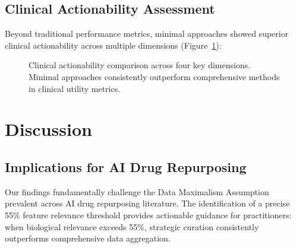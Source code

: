 \documentclass{article}
\begin{document}
\subsection{Clinical Actionability Assessment}

Beyond traditional performance metrics, minimal approaches showed superior clinical actionability across multiple dimensions (Figure~\ref{fig:actionability}):

\begin{figure}[t]
\centering
{}
\caption{Clinical actionability comparison across four key dimensions. Minimal approaches consistently outperform comprehensive methods in clinical utility metrics.}
\label{fig:actionability}
\end{figure}

\section{Discussion}

\subsection{Implications for AI Drug Repurposing}

Our findings fundamentally challenge the Data Maximalism Assumption prevalent across AI drug repurposing literature. The identification of a precise 55\% feature relevance threshold provides actionable guidance for practitioners: when biological relevance exceeds 55\%, strategic curation consistently outperforms comprehensive data aggregation.
\end{document}
